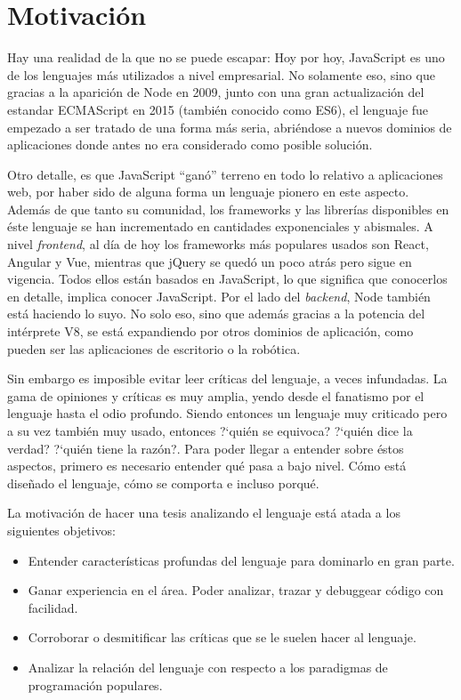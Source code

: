 \section{Motivación}

Hay una realidad de la que no se puede escapar: Hoy por hoy, JavaScript es uno de los lenguajes más utilizados a nivel empresarial. No solamente eso, sino que gracias a la aparición de Node en 2009, junto con una gran actualización del estandar ECMAScript en 2015 (también conocido como ES6), el lenguaje fue empezado a ser tratado de una forma más seria, abriéndose a nuevos dominios de aplicaciones donde antes no era considerado como posible solución.

Otro detalle, es que JavaScript "`ganó"' terreno en todo lo relativo a aplicaciones web, por haber sido de alguna forma un lenguaje pionero en este aspecto. Además de que tanto su comunidad, los frameworks y las librerías disponibles en éste lenguaje se han incrementado en cantidades exponenciales y abismales. A nivel \textit{frontend}, al día de hoy los frameworks más populares usados son React, Angular y Vue, mientras que jQuery se quedó un poco atrás pero sigue en vigencia. Todos ellos están basados en JavaScript, lo que significa que conocerlos en detalle, implica conocer JavaScript. Por el lado del \textit{backend}, Node también está haciendo lo suyo. No solo eso, sino que además gracias a la potencia del intérprete V8, se está expandiendo por otros dominios de aplicación, como pueden ser las aplicaciones de escritorio o la robótica.

Sin embargo es imposible evitar leer críticas del lenguaje, a veces infundadas. La gama de opiniones y críticas es muy amplia, yendo desde el fanatismo por el lenguaje hasta el odio profundo. Siendo entonces un lenguaje muy criticado pero a su vez también muy usado, entonces ?`quién se equivoca? ?`quién dice la verdad? ?`quién tiene la razón?. Para poder llegar a entender sobre éstos aspectos, primero es necesario entender qué pasa a bajo nivel. Cómo está diseñado el lenguaje, cómo se comporta e incluso porqué.

La motivación de hacer una tesis analizando el lenguaje está atada a los siguientes objetivos:

\begin{itemize}
\item Entender características profundas del lenguaje para dominarlo en gran parte.
\item Ganar experiencia en el área. Poder analizar, trazar y debuggear código con facilidad.
\item Corroborar o desmitificar las críticas que se le suelen hacer al lenguaje.
\item Analizar la relación del lenguaje con respecto a los paradigmas de programación populares.
\end{itemize}